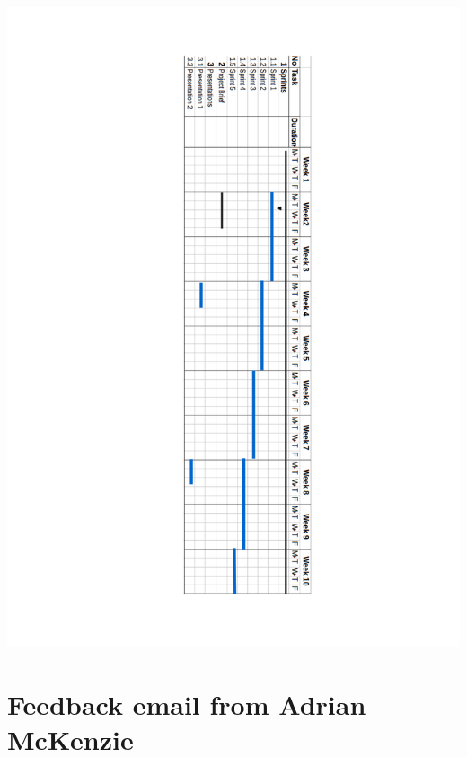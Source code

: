 \documentclass[a4paper, 12pt, twoside]{article}
\begin{document}
\begin{center}
\includegraphics[scale=0.8]{GanttChart.pdf}
\end{center}

\section{Feedback email from Adrian McKenzie}
\end{document}
